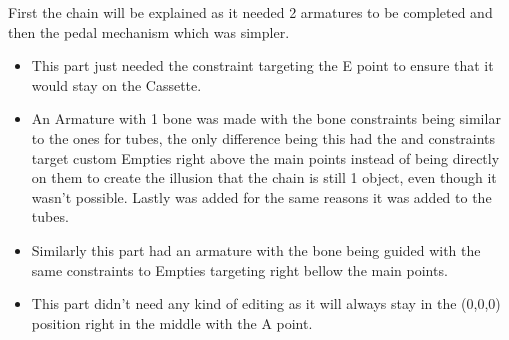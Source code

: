 \documentclass[letterpaper,10pt,english]{jupyterBook}
\begin{document}
\sphinxAtStartPar
{} First the chain will be explained as it needed 2 armatures to be completed and then the pedal mechanism which was simpler.
\begin{itemize}
\item {} 
\sphinxAtStartPar
{} This part just needed the  constraint targeting the E point to ensure that it would stay on the Cassette.

\item {} 
\sphinxAtStartPar
{} An Armature with 1 bone was made with the bone constraints being similar to the ones for tubes, the only difference being this had the  and  constraints target custom Empties right above the main points instead of being directly on them to create the illusion that the chain is still 1 object, even though it wasn’t possible. Lastly  was added for the same reasons it was added to the tubes.

\item {} 
\sphinxAtStartPar
{} Similarly this part had an armature with the bone being guided with the same constraints to Empties targeting right bellow the main points.

\item {} 
\sphinxAtStartPar
{} This part didn’t need any kind of editing as it will always stay in the (0,0,0) position right in the middle with the A point.

\end{itemize}
\end{document}
